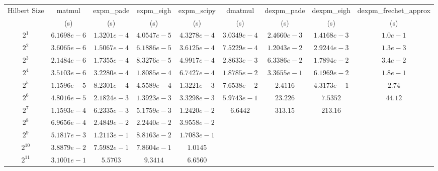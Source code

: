 \documentclass[letterpaper, 12pt]{article}
\begin{document}
\begin{table}[h]
  \begin{center}
    \hspace*{-1in}\begin{tabular}{c | c | c | c | c | c | c | c | c}
      Hilbert Size & matmul      & expm\_pade  & expm\_eigh  & expm\_scipy & dmatmul     & dexpm\_pade & dexpm\_eigh & dexpm\_frechet\_approx \\
                   & (s)         & (s)         & (s)         & (s)         & (s)         & (s)         & (s)         & (s)\\
      \hline
      $2^{1}$      & $6.1698e-6$ & $1.3201e-4$ & $4.0547e-5$ & $4.3278e-4$ & $3.0349e-4$ & $2.4660e-3$ & $1.4168e-3$ & $1.0e-1$\\
      $2^{2}$      & $3.6065e-6$ & $1.5067e-4$ & $6.1886e-5$ & $3.6125e-4$ & $7.5229e-4$ & $1.2043e-2$ & $2.9244e-3$ & $1.3e-3$\\
      $2^{3}$      & $2.1484e-6$ & $1.7355e-4$ & $8.3276e-5$ & $4.9917e-4$ & $2.8633e-3$ & $6.3386e-2$ & $1.7894e-2$ & $3.4e-2$\\
      $2^{4}$      & $3.5103e-6$ & $3.2280e-4$ & $1.8085e-4$ & $6.7427e-4$ & $1.8785e-2$ & $3.3655e-1$ & $6.1969e-2$ & $1.8e-1$\\
      $2^{5}$      & $1.1596e-5$ & $8.2301e-4$ & $4.5589e-4$ & $1.3221e-3$ & $7.6538e-2$ & $2.4116$    & $4.3173e-1$ & $2.74$\\
      $2^{6}$      & $4.8016e-5$ & $2.1824e-3$ & $1.3923e-3$ & $3.3298e-3$ & $5.9743e-1$ & $23.226$    & $7.5352$    & $44.12$\\
      $2^{7}$      & $1.1593e-4$ & $6.2335e-3$ & $5.1759e-3$ & $1.2420e-2$ & $6.6442$    & $313.15$    & $213.16$    &\\
      $2^{8}$      & $6.9656e-4$ & $2.4849e-2$ & $2.2440e-2$ & $3.9558e-2$ &             &             &             &\\ 
      $2^{9}$      & $5.1817e-3$ & $1.2113e-1$ & $8.8163e-2$ & $1.7083e-1$ &             &             &             &\\
      $2^{10}$     & $3.8879e-2$ & $7.5982e-1$ & $7.8604e-1$ & $1.0145$    &             &             &             &\\
      $2^{11}$     & $3.1001e-1$ & $5.5703$    & $9.3414$    & $6.6560$    &             &             &             &\\
    \end{tabular}\hspace*{-1in}
  \end{center}

\end{table}
\end{document}

